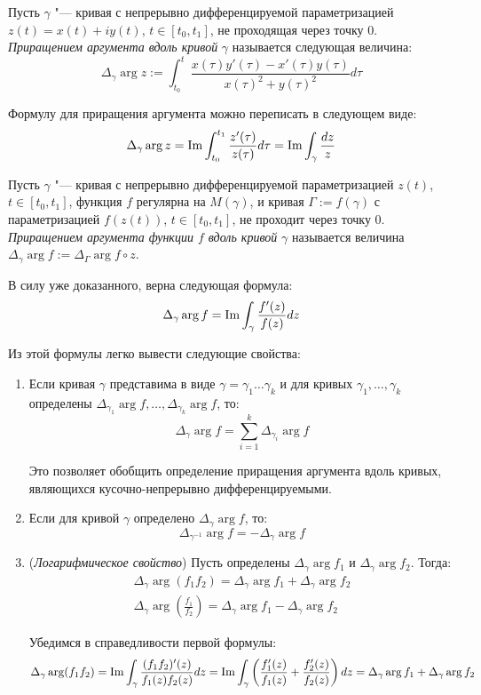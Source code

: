 \begin{definition}
	Пусть $\gamma$ "--- кривая с непрерывно дифференцируемой параметризацией $z(t) = x(t) + iy(t)$, $t \in [t_0, t_1]$, не проходящая через точку $0$. \textit{Приращением аргумента вдоль кривой} $\gamma$ называется следующая величина:
	\[\Delta_\gamma\arg{z} := \int_{t_0}^t\frac{x(\tau)y'(\tau) - x'(\tau)y(\tau)}{x(\tau)^2 + y(\tau)^2}d\tau\]
\end{definition}

\begin{note}
	Формулу для приращения аргумента можно переписать в следующем виде:
	\[\Delta_\gamma \arg{z} = \operatorname{Im}\int_{t_0}^{t_1}\frac{z'(\tau)}{z(\tau)}d\tau = \operatorname{Im}\int_\gamma \frac{dz}{z}\]
\end{note}

\begin{definition}
	Пусть $\gamma$ "--- кривая с непрерывно дифференцируемой параметризацией $z(t)$, $t \in [t_0, t_1]$, функция $f$ регулярна на $M(\gamma)$, и кривая $\Gamma := f(\gamma)$ с параметризацией $f(z(t))$, $t \in [t_0, t_1]$, не проходит через точку $0$. \textit{Приращением аргумента функции $f$ вдоль кривой} $\gamma$ называется величина $\Delta_\gamma\arg{f} := \Delta_\Gamma\arg{f \circ z}$.
\end{definition}

\begin{note}
	В силу уже доказанного, верна следующая формула:
	\[\Delta_\gamma\arg{f} = \operatorname{Im}\int_\gamma \frac{f'(z)}{f(z)}dz\]
	
	Из этой формулы легко вывести следующие свойства:
	\begin{enumerate}
		\item Если кривая $\gamma$ представима в виде $\gamma = \gamma_1\dotsc \gamma_k$ и для кривых $\gamma_1, \dotsc, \gamma_k$ определены $\Delta_{\gamma_1}\arg f, \dotsc, \Delta_{\gamma_k}\arg f$, то:
		\[\Delta_{\gamma}\arg f = \sum_{i = 1}^k\Delta_{\gamma_i}\arg f\]
		
		Это позволяет обобщить определение приращения аргумента вдоль кривых, являющихся кусочно-непрерывно дифференцируемыми.
		
		\item Если для кривой $\gamma$ определено $\Delta_{\gamma}\arg f$, то:
		\[\Delta_{\gamma^{-1}}\arg f = -\Delta_{\gamma}\arg f\]
		
		\item (\textit{Логарифмическое свойство}) Пусть определены $\Delta_{\gamma}\arg f_1$ и $\Delta_{\gamma}\arg f_2$. Тогда:
		\begin{gather*}
			\Delta_{\gamma}\arg (f_1f_2) = \Delta_{\gamma}\arg f_1 + \Delta_{\gamma}\arg f_2
			\\
			\Delta_{\gamma}\arg \left(\frac{f_1}{f_2}\right) = \Delta_{\gamma}\arg f_1 - \Delta_{\gamma}\arg f_2
		\end{gather*}
	
		Убедимся в справедливости первой формулы:
		\[\Delta_{\gamma}\arg (f_1f_2) =  \operatorname{Im}\int_\gamma \frac{(f_1f_2)'(z)}{f_1(z)f_2(z)}dz = \operatorname{Im}\int_\gamma \left(\frac{f_1'(z)}{f_1(z)} + \frac{f_2'(z)}{f_2(z)}\right)dz = \Delta_{\gamma}\arg f_1 + \Delta_{\gamma}\arg f_2\]
	\end{enumerate}
\end{note}

